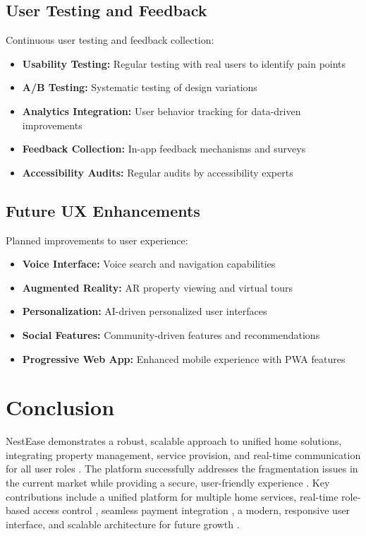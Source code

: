 \documentclass[conference]{IEEEtran}
\begin{document}
\subsection{User Testing and Feedback}
Continuous user testing and feedback collection:

\begin{itemize}
    \item \textbf{Usability Testing:} Regular testing with real users to identify pain points
    \item \textbf{A/B Testing:} Systematic testing of design variations
    \item \textbf{Analytics Integration:} User behavior tracking for data-driven improvements
    \item \textbf{Feedback Collection:} In-app feedback mechanisms and surveys
    \item \textbf{Accessibility Audits:} Regular audits by accessibility experts
\end{itemize}

\subsection{Future UX Enhancements}
Planned improvements to user experience:

\begin{itemize}
    \item \textbf{Voice Interface:} Voice search and navigation capabilities
    \item \textbf{Augmented Reality:} AR property viewing and virtual tours
    \item \textbf{Personalization:} AI-driven personalized user interfaces
    \item \textbf{Social Features:} Community-driven features and recommendations
    \item \textbf{Progressive Web App:} Enhanced mobile experience with PWA features
\end{itemize}

\section{Conclusion}
NestEase demonstrates a robust, scalable approach to unified home solutions, integrating property management, service provision, and real-time communication for all user roles \cite{real_estate_platforms}. The platform successfully addresses the fragmentation issues in the current market while providing a secure, user-friendly experience \cite{user_experience}. Key contributions include a unified platform for multiple home services, real-time role-based access control \cite{role_based_access}, seamless payment integration \cite{payment_security}, a modern, responsive user interface, and scalable architecture for future growth \cite{scalability_patterns}.
\end{document}
